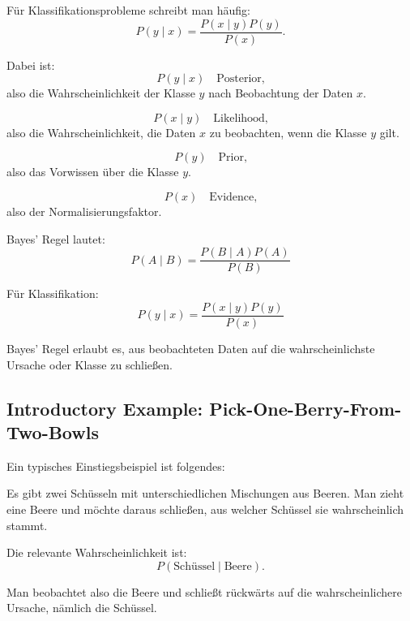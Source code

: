 \documentclass[11pt,a4paper]{scrartcl}
\begin{document}
\begin{calculationbox}
    Für Klassifikationsprobleme schreibt man häufig:
    \[
        P(y \mid x)
        =
        \frac{P(x \mid y)P(y)}{P(x)}.
    \]

    Dabei ist:
    \[
        P(y \mid x)
        \quad \text{Posterior,}
    \]
    also die Wahrscheinlichkeit der Klasse \(y\) nach Beobachtung der Daten \(x\).

    \[
        P(x \mid y)
        \quad \text{Likelihood,}
    \]
    also die Wahrscheinlichkeit, die Daten \(x\) zu beobachten, wenn die Klasse
    \(y\) gilt.

    \[
        P(y)
        \quad \text{Prior,}
    \]
    also das Vorwissen über die Klasse \(y\).

    \[
        P(x)
        \quad \text{Evidence,}
    \]
    also der Normalisierungsfaktor.
\end{calculationbox}

\begin{answerbox}
    Bayes' Regel lautet:
    \[
        \boxed{
            P(A \mid B)
            =
            \frac{P(B \mid A)P(A)}{P(B)}
        }
    \]

    Für Klassifikation:
    \[
        \boxed{
            P(y \mid x)
            =
            \frac{P(x \mid y)P(y)}{P(x)}
        }
    \]

    Bayes' Regel erlaubt es, aus beobachteten Daten auf die wahrscheinlichste
    Ursache oder Klasse zu schließen.
\end{answerbox}

\subsection{Introductory Example: Pick-One-Berry-From-Two-Bowls}

\begin{solutionbox}
    Ein typisches Einstiegsbeispiel ist folgendes:

    Es gibt zwei Schüsseln mit unterschiedlichen Mischungen aus Beeren.
    Man zieht eine Beere und möchte daraus schließen, aus welcher Schüssel sie
    wahrscheinlich stammt.

    Die relevante Wahrscheinlichkeit ist:
    \[
        P(\text{Schüssel} \mid \text{Beere}).
    \]

    Man beobachtet also die Beere und schließt rückwärts auf die wahrscheinlichere
    Ursache, nämlich die Schüssel.
\end{solutionbox}
\end{document}
